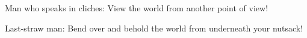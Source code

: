 \documentclass{article}
\begin{document}
Man who speaks in cliches: View the world from another point of view!

Last-straw man: Bend over and behold the world from underneath your
nutsack!
\end{document}
